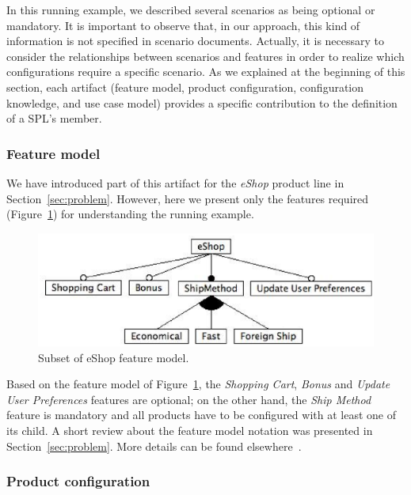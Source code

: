 \documentclass{acm_proc_article-sp}
\begin{document}
In this running example, we described several scenarios as being optional or
mandatory. It is important to observe that, in our approach, this kind of
information is not specified in scenario documents. Actually, it is necessary to
consider the relationships between scenarios and features in order to realize
which configurations require a specific scenario. As we explained at the
beginning of this section, each artifact (feature model, product configuration,
configuration knowledge, and use case model) provides a specific contribution to
the definition of a SPL's member.

\subsubsection{Feature model}

We have introduced part of this artifact for the \emph{eShop} product line in
Section~\ref{sec:problem}. However, here we present only the features required 
(Figure~\ref{fig:eshop-fm-re}) for understanding the running example.

 \begin{figure}[h]
 \begin{center}
  \includegraphics[scale=0.40]{img/eShop-fm-re.eps}
   \caption{Subset of eShop feature model.}
  \label{fig:eshop-fm-re}
  \end{center}
\end{figure}

Based on the feature model of Figure~\ref{fig:eshop-fm-re}, the \emph{Shopping
Cart}, \emph{Bonus} and \emph{Update User Preferences} features are optional;
on the other hand, the \emph{Ship Method} feature is mandatory and all products
have to be configured with at least one of its child. A short review about the
feature model notation was presented in Section~\ref{sec:problem}. More details
can be found elsewhere~\cite{gheyi-alloy-06,Czarnecki:2000aa}.

\subsubsection{Product configuration}\label{subsub:pc}
\end{document}

